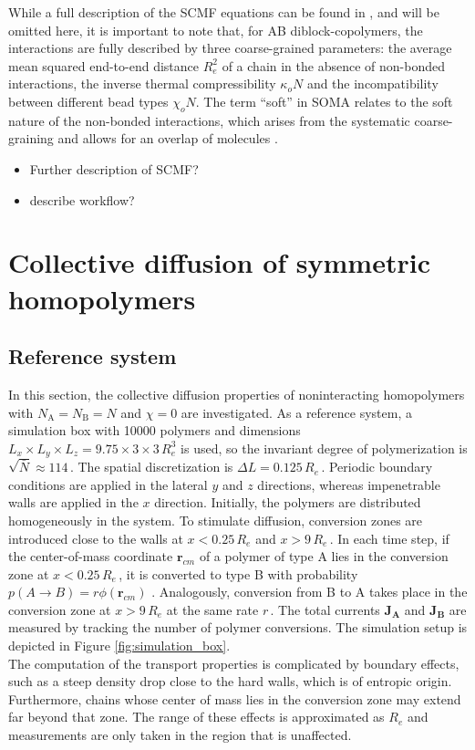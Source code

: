 \documentclass[bachelor,       %
               twoside,        %
               BCOR10mm,       %
                ngerman,english  %
               ]{GAUBM}
\begin{document}
While a full description of the SCMF equations can be found in \cite{Daoulas06}, and will be omitted here, it is important to note that, for AB diblock-copolymers, the interactions are fully described by three coarse-grained parameters: the average mean squared end-to-end distance $R_{e}^2$ of a chain in the absence of non-bonded interactions, the inverse thermal compressibility $\kappa_o N$ and the incompatibility between different bead types $\chi_o N$. The term \enquote{soft} in SOMA relates to the soft nature of the non-bonded interactions, which arises from the systematic coarse-graining and allows for an overlap of molecules \cite{Mueller11soft}.

\begin{itemize}
  \item Further description of SCMF?
  \item describe workflow?
\end{itemize}

\chapter{Collective diffusion of symmetric homopolymers}

\section{Reference system}

In this section, the collective diffusion properties of noninteracting homopolymers with $N_\mathrm A=N_\mathrm B=N$ and $\chi=0$ are investigated. As a reference system, a simulation box with 10000 polymers and dimensions $L_x\times L_y\times L_z=9.75\times3\times3\,R_e^3$ is used, so the invariant degree of polymerization is $\sqrt{\bar{N}}\approx 114\,$. The spatial discretization is $\Delta L=0.125\,R_e\,$.  Periodic boundary conditions are applied in the lateral $y$ and $z$ directions, whereas impenetrable walls are applied in the $x$ direction. Initially, the polymers are distributed homogeneously in the system. To stimulate diffusion, conversion zones are introduced close to the walls at $x<0.25\,R_e$ and $x>9\,R_e\,$. In each time step, if the center-of-mass coordinate $\mathbf r_{cm}$ of a polymer of type A lies in the conversion zone at $x<0.25\,R_e\,$, it is converted to type B with probability $p(A\rightarrow B)=r\phi(\mathbf r_{cm})$ \cite{Dreyer22}. Analogously, conversion from B to A takes place in the conversion zone at $x>9\,R_e$ at the same rate $r\,$. The total currents $\mathbf{J_A}$ and $\mathbf{J_B}$ are measured by tracking the number of polymer conversions. The simulation setup is depicted in Figure \ref{fig:simulation_box}. \\
The computation of the transport properties is complicated by boundary effects, such as a steep density drop close to the hard walls, which is of entropic origin. Furthermore, chains whose center of mass lies in the conversion zone may extend far beyond that zone. The range of these effects is approximated as $R_e$ and measurements are only taken in the region that is unaffected. 
\end{document}
